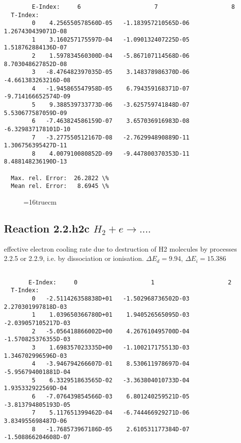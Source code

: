 \documentclass[12pt,dvipdfmx]{article}
\begin{document}
{\begin{small}
\begin{verbatim}
        E-Index:     6                     7                     8
  T-Index:
        0    4.256550578560D-05   -1.183957210565D-06    1.267430439071D-08
        1    3.160257175597D-04   -1.090132407225D-05    1.518762884136D-07
        2    1.597834560300D-04   -5.867107114568D-06    8.703048627852D-08
        3   -8.476482397035D-05    3.148378986370D-06   -4.661383263216D-08
        4   -1.945865547958D-05    6.794359168371D-07   -9.714166652574D-09
        5    9.388539733773D-06   -3.625759741848D-07    5.530677587059D-09
        6   -7.463824586159D-07    3.657036916983D-08   -6.329837178101D-10
        7   -3.277550512167D-08   -2.762994890889D-11    1.306756395427D-11
        8    4.007910080852D-09   -9.447800370353D-11    8.488148236190D-13

  Max. rel. Error:  26.2822 \%
  Mean rel. Error:   8.6945 \%

\end{verbatim}\end{small}
\begin{figure} \label{2.1.8ro}
\epsfxsize=16truecm
\end{figure}
\newpage

\subsection{
  Reaction 2.2.h2c $H_2 + e \rightarrow  ....$
}

   effective electron cooling rate due to destruction of H2 molecules by
   processes 2.2.5 or 2.2.9, i.e. by dissociation or ionisation.
$\Delta E_d = 9.94$, $\Delta E_i = 15.386$


\begin{small}\begin{verbatim}

       E-Index:     0                     1                     2
  T-Index:
        0   -2.511426358838D+01   -1.502968736502D-03    2.270301997818D-03
        1    1.039650366780D+01    1.940526565095D-03   -2.039057105217D-03
        2   -5.056418866002D+00    4.267610495700D-04   -1.570825376355D-03
        3    1.698357023335D+00   -1.100217175513D-03    1.346702996596D-03
        4   -3.946794266607D-01    8.530611978697D-04   -5.956794001881D-04
        5    6.332951863565D-02   -3.363804010733D-04    1.935332922569D-04
        6   -7.076439854566D-03    6.801240259521D-05   -3.813794805193D-05
        7    5.117651399462D-04   -6.744466929271D-06    3.834955698487D-06
        8   -1.768573967186D-05    2.610531177384D-07   -1.508866204608D-07


\end{verbatim}
\end{small}}
\end{document}
